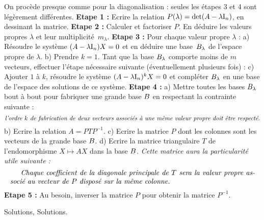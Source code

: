 On proc\`ede presque comme pour la diagonalisation :  seules les \'etapes 3 et 4 sont l\'eg\`erement diff\'erentes. 
\medskip
\noindent
{\bf Etape 1 : }Ecrire la relation $P(\lambda)=\det(A-\lambda\hbox{I}_n)$, en dessinant la matrice. \medskip\noindent
\medskip
\noindent
{\bf Etape 2 : }Calculer et factoriser $P$. En d\'eduire les valeurs propres $\lambda$ et leur multiplicit\'e~$m_\lambda$.\medskip\noindent
\medskip
\noindent
{\bf Etape 3 : }Pour chaque valeur propre $\lambda$ : \pn 
a) R\'esoudre le syst\`eme $(A-\lambda\hbox{I}_n)X=0$ et en d\'eduire une base~$\sc B_\lambda$ de l'espace propre de $\lambda$. \pn
b) Prendre $k=1$. Tant que la base $\sc B_\lambda$ comporte moins de $m$ vecteurs, effectuer l'\'etape n\'ecessaire suivante (\'eventuellement plusieurs fois) :\pn
c) Ajouter $1$ \`a $k$, r\'esoudre le syst\`eme $(A-\lambda\hbox{I}_n)^kX=0$ et compl\'eter $\sc B_\lambda$ en une base de l'espace des solutions de ce syst\`eme. 
\medskip\noindent
{\bf Etape 4 : } a) Mettre toutes les bases $\sc B_\lambda$ bout \`a bout pour fabriquer une grande base $\sc B$ en respectant la contrainte suivante : 
$$
\hbox{\it l'ordre $k$ de fabrication de deux vecteurs associ\'es \`a une m\^eme valeur propre doit \^etre respect\'e}. 
$$
b) Ecrire la relation $A=PTP^{-1}$. \pn
c) Ecrire la matrice $P$ dont les colonnes sont les vecteurs de la grande base $\sc B$. \pn
d) Ecrire la matrice triangulaire $T$ de l'endomorphisme $X\mapsto AX$ dans la base $\sc B$. \pn
{\it Cette matrice aura la particularit\'e utile suivante :}
$$ 
\vbox{\it Chaque coefficient de la diagonale principale de $T$ sera la valeur propre associ\'e au vecteur de $P$ dispos\'e sur la m\^eme colonne.} 
$$
\medskip
\noindent
{\bf Etape 5 : }Au besoin, inverser la matrice $P$ pour obtenir la matrice $P^{-1}$. 

\LD@Inferno@Master@false
\eject
{}%
\bigskip
{}%

\bigskip
{}%
\bigskip
{}%
\bigskip
{}%
\bigskip
{}%


% 
% 
% 
% 

\Chapter Solutions, Solutions.

\LD@Exo@Sol@Display

\bye









